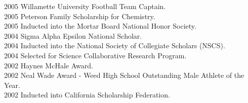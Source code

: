 2005 \hspace{58pt} Willamette University Football Team Captain. \\
2005 \hspace{58pt} Peterson Family Scholarship for Chemistry. \\
2005 \hspace{58pt} Inducted into the Mortar Board National Honor Society.  \\
2004 \hspace{58pt} Sigma Alpha Epsilon National Scholar.  \\
2004 \hspace{58pt} Inducted into the National Society of Collegiate Scholars (NSCS).  \\
2004 \hspace{58pt} Selected for Science Collaborative Research Program. \\
2002 \hspace{58pt} Haynes McHale Award.  \\
2002 \hspace{58pt} Neal Wade Award - Weed High School Outstanding Male Athlete of the Year. \\
2002 \hspace{58pt} Inducted into California Scholarship Federation.